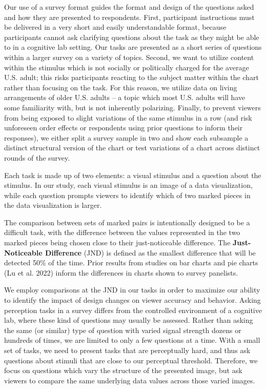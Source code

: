 \documentclass[
]{jds}
\begin{document}
Our use of a survey format guides the format and design of the questions
asked and how they are presented to respondents. First, participant
instructions must be delivered in a very short and easily understandable
format, because participants cannot ask clarifying questions about the
task as they might be able to in a cognitive lab setting. Our tasks are
presented as a short series of questions within a larger survey on a
variety of topics. Second, we want to utilize content within the
stimulus which is not socially or politically charged for the average
U.S. adult; this risks participants reacting to the subject matter
within the chart rather than focusing on the task. For this reason, we
utilize data on living arrangements of older U.S. adults -- a topic
which most U.S. adults will have some familiarity with, but is not
inherently polarizing. Finally, to prevent viewers from being exposed to
slight variations of the same stimulus in a row (and risk unforeseen
order effects or respondents using prior questions to inform their
responses), we either split a survey sample in two and show each
subsample a distinct structural version of the chart or test variations
of a chart across distinct rounds of the survey.

Each task is made up of two elements: a visual stimulus and a question
about the stimulus. In our study, each visual stimulus is an image of a
data visualization, while each question prompts viewers to identify
which of two marked pieces in the data visualization is larger.

The comparison between sets of marked pairs is intentionally designed to
be a difficult task, with the difference between the values represented
in the two marked pieces being chosen close to their just-noticeable
difference. The \textbf{Just-Noticeable Difference} (JND) is defined as
the smallest difference that will be detected 50\% of the time. Prior
results from studies on bar charts and pie charts (Lu et al. 2022)
inform the differences in charts shown to survey panelists.

We employ comparisons at the JND in our tasks in order to maximize our
ability to identify the impact of design changes on viewer accuracy and
behavior. Asking perception tasks in a survey differs from the
controlled environment of a cognitive lab, where these kind of questions
may usually be assessed. Rather than asking the same (or similar) type
of question with varied signal strength dozens or hundreds of times, we
are limited to only a few questions at a time. With a small set of
tasks, we need to present tasks that are perceptually hard, and thus ask
questions about stimuli that are close to our perceptual threshold.
Therefore, we focus on questions which vary the structure of the
presented image, but ask viewers to compare the same underlying data
values across those varied images.
\end{document}
